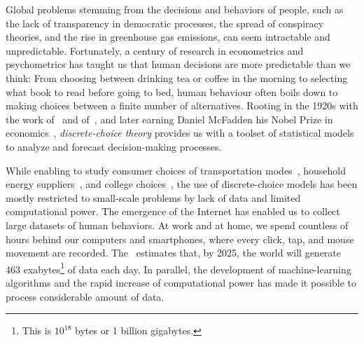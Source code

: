 Global problems stemming from the decisions and behaviors of people, such as the lack of transparency in democratic processes, the spread of conspiracy theories, and the rise in greenhouse gas emissions, can seem intractable and unpredictable.
Fortunately, a century of research in econometrics and psychometrics has taught us that human decisions are more predictable than we think:
From choosing between drinking tea or coffee in the morning to selecting what book to read before going to bed, human behaviour often boils down to making choices between a finite number of alternatives.
Rooting in the 1920s with the work of~\citet{thurstone1927law} and of~\citet{zermelo1928berechnung}, and later earning Daniel McFadden his Nobel Prize in economics~\citep{mcfadden2001economic}, \emph{discrete-choice theory} provides us with a toolset of statistical models to analyze and forecast decision-making processes.

While enabling to study consumer choices of transportation modes~\citep{ben1973structure,mcfadden1974measurement}, household energy suppliers~\citep{goett2000customers}, and college choices~\citep{fuller1982new}, the use of discrete-choice models has been mostly restricted to small-scale problems by lack of data and limited computational power.
The emergence of the Internet has enabled us to collect large datasets of human behaviors.
At work and at home, we spend countless of hours behind our computers and smartphones, where every click, tap, and mouse movement are recorded.
The~\citet{wef2019data} estimates that, by 2025, the world will generate 463 exabytes\footnote{This is $10^{18}$ bytes or 1 billion gigabytes.} of data each day.
In parallel, the development of machine-learning algorithms and the rapid increase of computational power has made it possible to process considerable amount of data.

